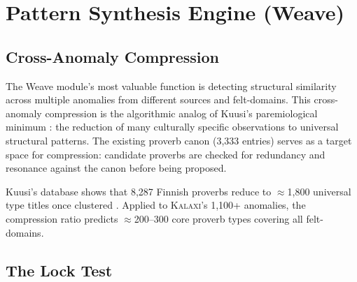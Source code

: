 \documentclass[12pt,a4paper]{article}
\theoremstyle{definition}
\theoremstyle{remark}
\newcommand{\kalaxi}{\textsc{Kalaxi}}
\begin{document}
\section{Pattern Synthesis Engine (Weave)}
\label{sec:weave}

\subsection{Cross-Anomaly Compression}

The Weave module's most valuable function is detecting structural similarity across
multiple anomalies from different sources and felt-domains. This cross-anomaly
compression is the algorithmic analog of Kuusi's paremiological minimum
\cite{lauhakangas2014}: the reduction of many culturally specific observations to
universal structural patterns. The existing proverb canon (3,333 entries) serves as a
target space for compression: candidate proverbs are checked for redundancy and
resonance against the canon before being proposed.

\begin{algorithm}[H]
\SetAlgoLined
{}
\caption{Cross-Anomaly Compression (Weave)}
\label{alg:compression}
\end{algorithm}

Kuusi's database shows that 8{,}287 Finnish proverbs reduce to $\approx$1{,}800
universal type titles once clustered \cite{lauhakangas2014}. Applied to \kalaxi{}'s
1{,}100+ anomalies, the compression ratio predicts $\approx$200–300 core proverb
types covering all felt-domains.

\subsection{The Lock Test}
\end{document}
